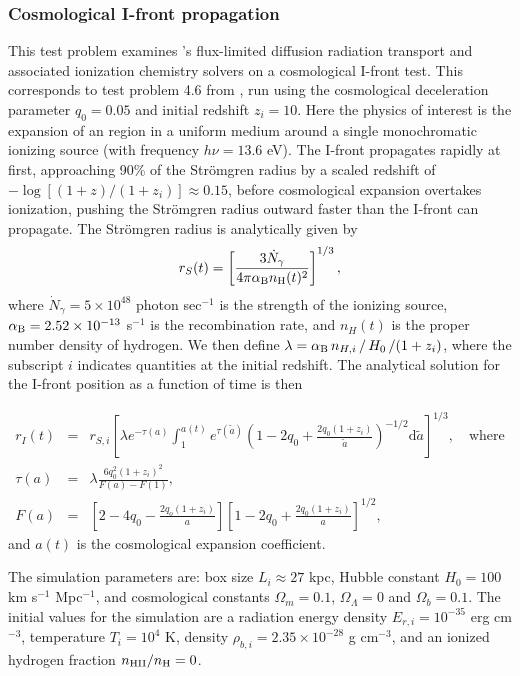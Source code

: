 \subsubsection{Cosmological I-front propagation}
\label{sec.tests.fld}

This test problem examines \enzo's flux-limited diffusion radiation
transport and associated ionization chemistry solvers on a
cosmological I-front test.  This corresponds to test problem 4.6 from
\cite{ReynoldsHayesPaschosNorman2009}, run using the cosmological
deceleration parameter $q_0 = 0.05$ and initial redshift $z_i=10$.
Here the physics of interest is the expansion of an  region
in a uniform medium around a single monochromatic ionizing source
(with frequency $h\nu = 13.6$ eV).  The I-front propagates rapidly at
first, approaching 90\% of the Str{\" o}mgren radius by a scaled
redshift of $-\log\left[(1+z)/(1+z_i)\right] \approx 0.15$, before
cosmological expansion overtakes ionization, pushing the Str{\"
  o}mgren radius outward faster than the I-front can propagate.  The Str{\" o}mgren radius is analytically given by
\[
   r_S(t) = \left[\frac{3\dot{N}_{\gamma}}{4\pi \alpha_{\rm B}
   n_{\rm H}(t)^2}\right]^{1/3}, 
\]
where $\dot{N}_{\gamma} = 5 \times 10^{48}$ photon sec$^{-1}$ is the
strength of the ionizing source, $\alpha_{\rm B} = 2.52 \times 10^{-13}$
s$^{-1}$ is the  recombination rate, and $n_H(t)$ is the
proper number density of hydrogen.  We then define $\lambda =
\alpha_{\rm B}\, n_{H,i}\, /\, H_0\, / (1+z_i)$, where the subscript $i$
indicates quantities at the initial redshift.  The analytical
solution for the I-front position as a function of time is then

\begin{eqnarray*}
   r_I(t) &=& r_{S,i} \left[\lambda e^{-\tau(a)} \int_1^{a(t)}
     e^{\tau(\tilde a)} \left(1 - 2q_0
     + \frac{2q_0(1+z_i)}{\tilde{a}}\right)^{-1/2}\mathrm
     d\tilde{a}\right]^{1/3}, \quad\text{where} \\ 
   \tau(a) &=& \lambda\frac{6q_0^2(1+z_i)^2}{F(a)-F(1)}, \\
   F(a) &=& \left[2-4q_0 - \frac{2q_o(1+z_i)}{a}\right] 
      \left[1-2q_0 + \frac{2q_0(1+z_i)}{a}\right]^{1/2},
\end{eqnarray*}
and $a(t)$ is the cosmological expansion coefficient.

The simulation parameters are: box size $L_i\approx 27$ kpc, Hubble
constant $H_0 = 100$ km s$^{-1}$ Mpc$^{-1}$, and cosmological constants $\Omega_m = 0.1$, $\Omega_\Lambda=0$ and $\Omega_b = 0.1$.  The
initial values for the simulation are a radiation energy density
$E_{r,i} = 10^{-35}$ erg cm$^{-3}$, temperature $T_i = 10^4$ K,
density $\rho_{b,i} = 2.35 \times 10^{-28}$ g cm$^{-3}$, and an
ionized hydrogen fraction $n_{\rm HII}/n_{\rm H} = 0$.

